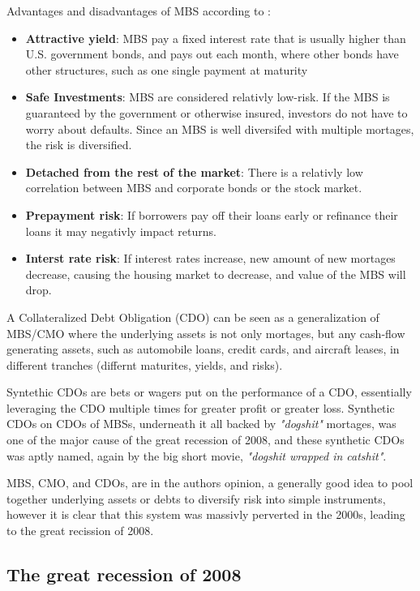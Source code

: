 Advantages and disadvantages of MBS according to \textcite{MBSInvestopedia}:
\begin{itemize}
    \item \textbf{Attractive yield}: MBS pay a fixed interest rate that is usually higher than U.S. government bonds, and pays out each month, where other bonds have other structures, such as one single payment at maturity 
    \item \textbf{Safe Investments}: MBS are considered relativly low-risk. If the MBS is guaranteed by the government or otherwise insured, investors do not have to worry about defaults. Since an MBS is well diversifed with multiple mortages, the risk is diversified. 
    \item \textbf{Detached from the rest of the market}: There is a relativly low correlation between MBS and corporate bonds or the stock market.
    \item \textbf{Prepayment risk}: If borrowers pay off their loans early or refinance their loans it may negativly impact returns. 
    \item \textbf{Interst rate risk}: If interest rates increase, new amount of new mortages decrease, causing the housing market to decrease, and value of the MBS will drop.
\end{itemize}

A Collateralized Debt Obligation (CDO) can be seen as a generalization of MBS/CMO where the underlying assets is not only mortages, but any cash-flow generating assets, such as automobile loans, credit cards, and aircraft leases, in different tranches (differnt maturites, yields, and risks).

Syntethic CDOs are bets or wagers put on the performance of a CDO, essentially leveraging the CDO multiple times for greater profit or greater loss. Synthetic CDOs on CDOs of MBSs, underneath it all backed by \textit{"dogshit"} mortages, was one of the major cause of the great recession of 2008, and these synthetic CDOs was aptly named, again by the big short movie, \textit{"dogshit wrapped in catshit"}. 

MBS, CMO, and CDOs, are in the authors opinion, a generally good idea to pool together underlying assets or debts to diversify risk into simple instruments, however it is clear that this system was massivly perverted in the 2000s, leading to the great recission of 2008.

\subsection{The great recession of 2008}

